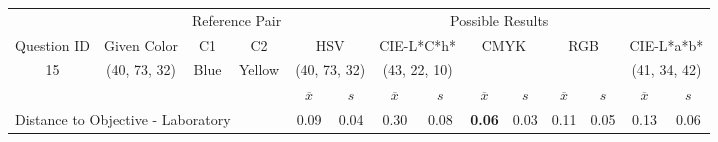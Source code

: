 \begin{table}[H]
  \resizebox{\textwidth}{!} {
  \begin{tabular}{lccccccccccccc}
    \hline
    \multicolumn{1}{c}{}                              &                                      & \multicolumn{2}{c}{Reference Pair}                   & \multicolumn{10}{c}{Possible Results}                                                                                                                                                                                                                                                                                        \\ \cline{3-14}
    \multicolumn{1}{c}{\multirow{-2}{*}{Question ID}} & \multirow{-2}{*}{Given Color}        & C1                       & C2                         & \multicolumn{2}{c}{HSV}                                        & \multicolumn{2}{c}{CIE-L*C*h*}                                 & \multicolumn{2}{c}{CMYK}                                       & \multicolumn{2}{c}{RGB}                                        & \multicolumn{2}{c}{CIE-L*a*b*}                                 \\ \hline
    \multicolumn{1}{c}{15}                             & \cellcolor[HTML]{00FF80}(40, 73, 32) & \multicolumn{1}{c|}{Blue} & \multicolumn{1}{c|}{Yellow}  & \multicolumn{2}{c|}{\cellcolor[HTML]{00FF80}(40, 73, 32)}      & \multicolumn{2}{c|}{\cellcolor[HTML]{FF0050}(43, 22, 10)}       & \multicolumn{2}{c|}{\cellcolor[HTML]{808080}{\color[HTML]{FFFFFF}(21, 22, 24)}}       & \multicolumn{2}{c|}{\cellcolor[HTML]{808080}{\color[HTML]{FFFFFF}(21, 22, 24)}}       & \multicolumn{2}{c|}{\cellcolor[HTML]{CA8AAA}(41, 34, 42)}       \\ \hline
                                                      & \multicolumn{1}{l}{}                 & \multicolumn{1}{l}{}     & \multicolumn{1}{l}{}       & \multicolumn{1}{c}{$\overline{x}$} & \multicolumn{1}{c}{$s$} & \multicolumn{1}{c}{$\overline{x}$} & \multicolumn{1}{c}{$s$} & \multicolumn{1}{c}{$\overline{x}$} & \multicolumn{1}{c}{$s$} & \multicolumn{1}{c}{$\overline{x}$} & \multicolumn{1}{c}{$s$} & \multicolumn{1}{c}{$\overline{x}$} & \multicolumn{1}{c}{$s$} \\ \hline
    \multicolumn{4}{l}{Distance to Objective - Laboratory}                                                                                           & \multicolumn{1}{|c}{0.09}       & \multicolumn{1}{c|}{0.04}    & \multicolumn{1}{|c}{0.30}       & \multicolumn{1}{c|}{0.08}    & \multicolumn{1}{|c}{\textbf{0.06}}       & \multicolumn{1}{c|}{0.03}    & \multicolumn{1}{|c}{0.11}       & \multicolumn{1}{c|}{0.05}    & \multicolumn{1}{|c}{0.13}       & \multicolumn{1}{c|}{0.06}    \\

\end{tabular}}
\end{table}
